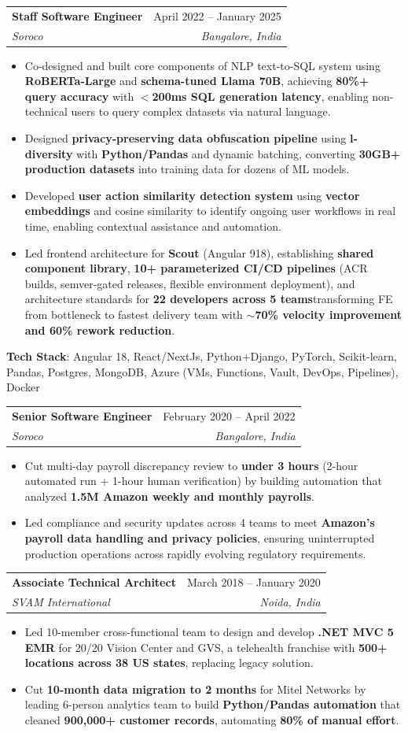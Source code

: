 \documentclass[a4paper,11pt]{article}
\makeatletter
\newcommand{\resumeItem}[1]{
  \item\small{
    {#1 \vspace{-3pt}}
  }
}
\newcommand{\resumeSubheading}[4]{
  \vspace{-2pt}\item
    \begin{tabular*}{0.97\textwidth}[t]{l@{\extracolsep{\fill}}r}
      \textbf{#1} & #2 \\
      \textit{\small#3} & \textit{\small #4} \\
    \end{tabular*}\vspace{-7pt}
}
\newcommand{\resumeItemListStart}{\begin{itemize}}
\newcommand{\resumeItemListEnd}{\end{itemize}\vspace{-8pt}}
\makeatother
\begin{document}
\vspace{4pt}
\resumeSubheading{Staff Software Engineer}{April 2022 -- January 2025}{Soroco}{Bangalore, India}
\resumeItemListStart
\resumeItem{Co-designed and built core components of NLP text-to-SQL system using \textbf{RoBERTa-Large} and \textbf{schema-tuned Llama 70B}, achieving \textbf{80\%+ query accuracy} with \textbf{$<$200ms SQL generation latency}, enabling non-technical users to query complex datasets via natural language.}
\resumeItem{Designed \textbf{privacy-preserving data obfuscation pipeline} using \textbf{l-diversity} with \textbf{Python/Pandas} and dynamic batching, converting \textbf{30GB+ production datasets} into training data for dozens of ML models.}
\resumeItem{Developed \textbf{user action similarity detection system} using \textbf{vector embeddings} and cosine similarity to identify ongoing user workflows in real time, enabling contextual assistance and automation.}
\resumeItem{Led frontend architecture for \textbf{Scout} (Angular 9\textrightarrow{}18), establishing \textbf{shared component library}, \textbf{10+ parameterized CI/CD pipelines} (ACR builds, semver-gated releases, flexible environment deployment), and architecture standards for \textbf{22 developers across 5 teams}\textemdash{}transforming FE from bottleneck to fastest delivery team with \textbf{$\sim$70\% velocity improvement and 60\% rework reduction}.}
\resumeItemListEnd
\vspace{2pt}
{\small\textbf{Tech Stack}: Angular 18, React/NextJs, Python+Django, PyTorch, Scikit-learn, Pandas, Postgres, MongoDB, Azure (VMs, Functions, Vault, DevOps, Pipelines), Docker}

\resumeSubheading{Senior Software Engineer}{February 2020 -- April 2022}{Soroco}{Bangalore, India}
\resumeItemListStart
\resumeItem{Cut multi-day payroll discrepancy review to \textbf{under 3 hours} (2-hour automated run + 1-hour human verification) by building automation that analyzed \textbf{1.5M Amazon weekly and monthly payrolls}.}
\resumeItem{Led compliance and security updates across 4 teams to meet \textbf{Amazon's payroll data handling and privacy policies}, ensuring uninterrupted production operations across rapidly evolving regulatory requirements.}
\resumeItemListEnd

\resumeSubheading{Associate Technical Architect}{March 2018 -- January 2020}{SVAM International}{Noida, India}
\resumeItemListStart
\resumeItem{Led 10-member cross-functional team to design and develop \textbf{.NET MVC 5 EMR} for 20/20 Vision Center and GVS, a telehealth franchise with \textbf{500+ locations across 38 US states}, replacing legacy solution.}
\resumeItem{Cut \textbf{10-month data migration to 2 months} for Mitel Networks by leading 6-person analytics team to build \textbf{Python/Pandas automation} that cleaned \textbf{900,000+ customer records}, automating \textbf{80\% of manual effort}.}
\resumeItemListEnd
\end{document}
